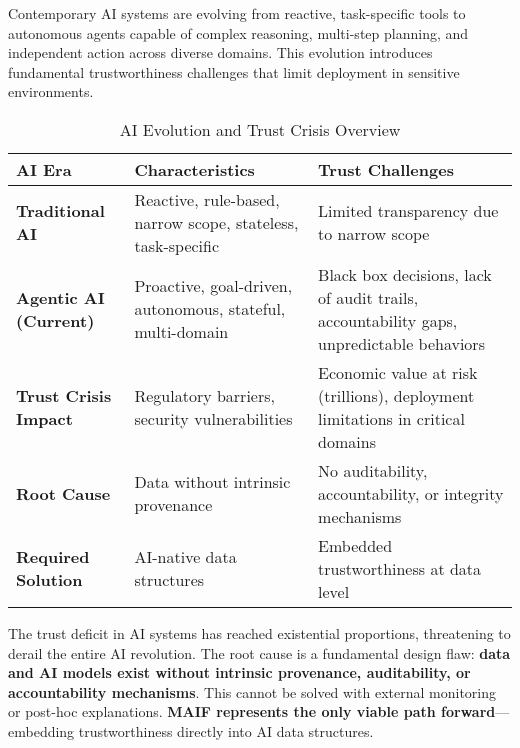 \documentclass[conference]{IEEEtran}
\begin{document}
Contemporary AI systems are evolving from reactive, task-specific tools to autonomous agents capable of complex reasoning, multi-step planning, and independent action across diverse domains. This evolution introduces fundamental trustworthiness challenges that limit deployment in sensitive environments.

\begin{table*}[!t]
\renewcommand{\arraystretch}{1.3}
\caption{AI Evolution and Trust Crisis Overview}
\label{tab:ai-evolution-crisis}
\centering
\footnotesize
\begin{tabular}{p{3cm}p{5cm}p{6cm}}
\toprule
\textbf{AI Era} & \textbf{Characteristics} & \textbf{Trust Challenges} \\
\midrule
\textbf{Traditional AI} & Reactive, rule-based, narrow scope, stateless, task-specific & Limited transparency due to narrow scope \\
\textbf{Agentic AI (Current)} & Proactive, goal-driven, autonomous, stateful, multi-domain & Black box decisions, lack of audit trails, accountability gaps, unpredictable behaviors \\
\textbf{Trust Crisis Impact} & Regulatory barriers, security vulnerabilities & Economic value at risk (trillions), deployment limitations in critical domains \\
\textbf{Root Cause} & Data without intrinsic provenance & No auditability, accountability, or integrity mechanisms \\
\textbf{Required Solution} & AI-native data structures & Embedded trustworthiness at data level \\
\bottomrule
\end{tabular}
\end{table*}

The trust deficit in AI systems has reached existential proportions, threatening to derail the entire AI revolution. The root cause is a fundamental design flaw: \textbf{data and AI models exist without intrinsic provenance, auditability, or accountability mechanisms}. This cannot be solved with external monitoring or post-hoc explanations. \textbf{MAIF represents the only viable path forward}—embedding trustworthiness directly into AI data structures.
\end{document}
